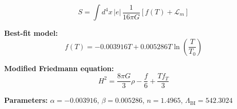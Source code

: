 
\begin{equation}
  S = \int d^4x \, |e| \, \frac{1}{16\pi G} \left[ f(T) + \mathcal{L}_m \right]
\end{equation}

\textbf{Best-fit model:}
\begin{equation}
  f(T) = -0.003916 T + 0.005286 T \ln\!\left(\frac{T}{T_0}\right)
\end{equation}

\textbf{Modified Friedmann equation:}
\begin{equation}
  H^2 = \frac{8\pi G}{3} \rho - \frac{f}{6} + \frac{T f_T}{3}
\end{equation}

\textbf{Parameters:}
$\alpha = -0.003916$, \quad
$\beta = 0.005286$, \quad
$n = 1.4965$, \quad
$\Lambda_{\text{BI}} = 542.3024$